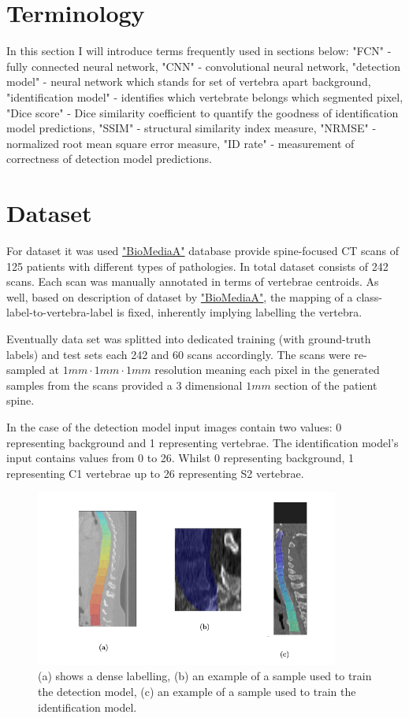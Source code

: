 \section{Terminology} 
In this section I will introduce terms frequently used in sections below: "FCN" - fully connected neural network, "CNN" - convolutional neural network, "detection model" - neural network which stands for set of vertebra apart background, "identification model" - identifies which vertebrate belongs which segmented pixel, "Dice score" - Dice similarity coefficient to quantify the goodness of identification model predictions, "SSIM" - structural similarity index measure, "NRMSE" - normalized root mean square error measure, "ID rate" - measurement of correctness of detection model predictions.

\section{Dataset}
For dataset it was used \href{https://biomedia.doc.ic.ac.uk/}{\color{blue}"BioMediaA"} database provide spine-focused CT scans of 125 patients with different types of pathologies. In total dataset consists of 242 scans. Each scan was manually annotated in terms of vertebrae centroids. As well, based on description of dataset by \href{https://biomedia.doc.ic.ac.uk/}{\color{blue}"BioMediaA"}, the mapping of a class-label-to-vertebra-label is fixed, inherently implying labelling the vertebra.    

Eventually data set was splitted into dedicated training (with ground-truth labels) and test sets each 242 and 60 scans accordingly. The scans were re-sampled at $1mm \cdot 1mm \cdot 1mm$ resolution meaning each pixel in the generated samples from the scans provided a 3 dimensional $1mm$ section of the patient spine.

In the case of the detection model input images contain two values: 0 representing background and 1 representing vertebrae. The identification model’s input contains values from 0 to 26. Whilst 0 representing background, 1 representing C1 vertebrae up to 26 representing S2 vertebrae. 

\begin{figure}[h]
    \centering \includegraphics[width=10cm]{images/labeled_data.png}
    \caption {(a) shows a dense labelling, (b) an example of a sample used to train the detection model, (c) an example of a sample used to train the identification model.}
    \label{fig:labeled_data}
\end{figure}

